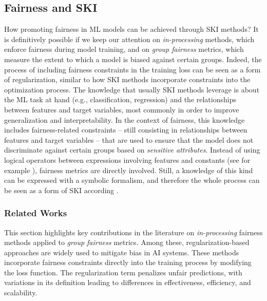 \subsection{Fairness and SKI}\label{subsec:fairness-ski}
%
How promoting fairness in \gls{ML} models can be achieved through \gls{SKI} methods?
%
It is definitively possible if we keep our attention on \emph{in-processing} methods, which enforce fairness during model training, and on \emph{group fairness} metrics, which measure the extent to which a model is biased against certain groups.
%
Indeed, the process of including fairness constraints in the training loss can be seen as a form of regularization, similar to how \gls{SKI} methods incorporate constraints into the optimization process.
%
The knowledge that usually \gls{SKI} methods leverage is about the \gls{ML} task at hand (e.g., classification, regression) and the relationships between features and target variables, most commonly in order to improve generalization and interpretability.
%
In the context of fairness, this knowledge includes fairness-related constraints -- still consisting in relationships between features and target variables -- that are used to ensure that the model does not discriminate against certain groups based on \emph{sensitive attributes}.
%
Instead of using logical operators between expressions involving features and constants (see for example ), fairness metrics are directly involved.
%
Still, a knowledge of this kind can be expressed with a symbolic formalism, and therefore the whole process can be seen as a form of \gls{SKI} according .


\subsubsection{Related Works}
%
This section highlights key contributions in the literature on \emph{in-processing} fairness methods applied to \emph{group fairness} metrics.
%
Among these, regularization-based approaches are widely used to mitigate bias in \gls{AI} systems.
%
These methods incorporate fairness constraints directly into the training process by modifying the loss function.
%
The regularization term penalizes unfair predictions, with variations in its definition leading to differences in effectiveness, efficiency, and scalability.
%

